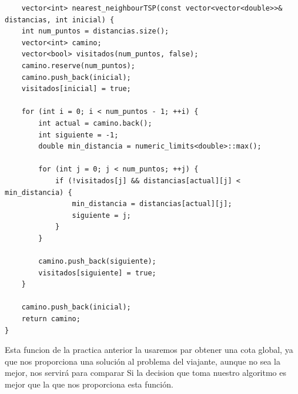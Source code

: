 \documentclass[11pt,openany]{book}
\begin{document}
\begin{lstlisting}
    vector<int> nearest_neighbourTSP(const vector<vector<double>>& distancias, int inicial) {
    int num_puntos = distancias.size();
    vector<int> camino;
    vector<bool> visitados(num_puntos, false);
    camino.reserve(num_puntos);
    camino.push_back(inicial);
    visitados[inicial] = true;

    for (int i = 0; i < num_puntos - 1; ++i) {
        int actual = camino.back();
        int siguiente = -1;
        double min_distancia = numeric_limits<double>::max();

        for (int j = 0; j < num_puntos; ++j) {
            if (!visitados[j] && distancias[actual][j] < min_distancia) {
                min_distancia = distancias[actual][j];
                siguiente = j;
            }
        }

        camino.push_back(siguiente);
        visitados[siguiente] = true;
    }

    camino.push_back(inicial);
    return camino;
}
\end{lstlisting} 
Esta funcion de la practica anterior la usaremos par obtener una cota global, ya que nos proporciona una solución al problema del viajante, aunque no sea la mejor, nos servirá para comparar
Si la decision que toma nuestro algoritmo es mejor que la que nos proporciona esta función. 
\end{document}
